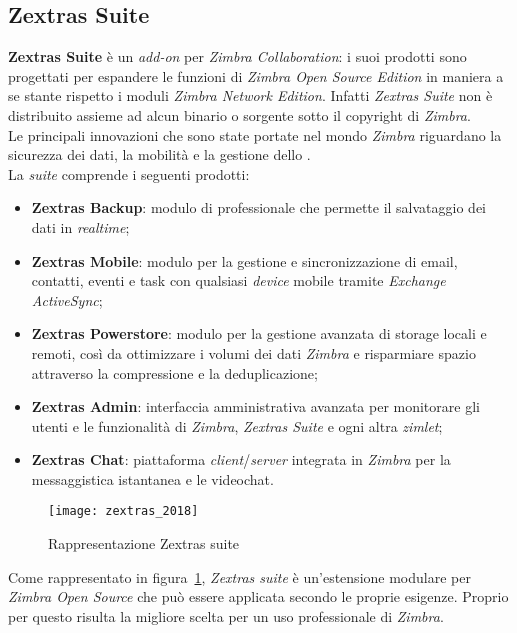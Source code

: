 \subsection{Zextras Suite} \label{subsec:Zextras}
\textbf{Zextras Suite} è un \emph{add-on} per \emph{Zimbra Collaboration}: i suoi prodotti sono progettati per espandere le funzioni di \emph{Zimbra Open Source Edition} in maniera a se stante rispetto i moduli \emph{Zimbra Network Edition}. Infatti \emph{Zextras Suite} non è distribuito assieme ad alcun binario o sorgente sotto il copyright di \emph{Zimbra}. \\
Le principali innovazioni che sono state portate nel mondo \emph{Zimbra} riguardano la sicurezza dei dati, la mobilità e la gestione dello .\\
La \emph{suite} comprende i seguenti prodotti:
	\begin{itemize}
		\item \textbf{Zextras Backup}: modulo di  professionale che permette il salvataggio dei dati in \emph{realtime};
		\item \textbf{Zextras Mobile}: modulo per la gestione e sincronizzazione di email, contatti, eventi e task con qualsiasi \emph{device} mobile tramite \emph{Exchange ActiveSync};
		\item \textbf{Zextras Powerstore}: modulo per la gestione avanzata di storage locali e remoti, così da ottimizzare i volumi dei dati \emph{Zimbra} e risparmiare spazio attraverso la compressione e la deduplicazione;
		\item \textbf{Zextras Admin}: interfaccia amministrativa avanzata per monitorare gli utenti e le funzionalità di \emph{Zimbra}, \emph{Zextras Suite} e ogni altra \emph{zimlet};
		\item \textbf{Zextras Chat}: piattaforma \emph{client}/\emph{server} integrata in \emph{Zimbra} per la messaggistica istantanea e le videochat.
	\end{itemize}

\begin{figure}[H] 
	\centering
	\texttt{[image: zextras\_2018]}
	\caption{Rappresentazione Zextras suite}
	\label{fig:modulizextras}
\end{figure}
Come rappresentato in figura~\ref{fig:modulizextras}, \emph{Zextras suite} è un'estensione modulare per \emph{Zimbra Open Source} che può essere applicata secondo le proprie esigenze. Proprio per questo risulta la migliore scelta per un uso professionale di \emph{Zimbra}.

